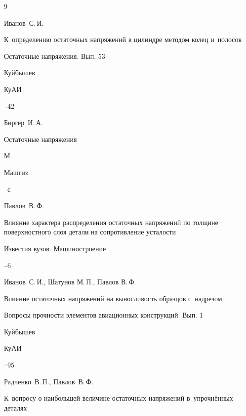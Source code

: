 \begin{thebibliography}{9}


\by Иванов~С.\,И.

\paper К~определению остаточных напряжений в цилиндре методом колец и~полосок

\inbook Остаточные напряжения. {\rm Вып. 53}

\publaddr Куйбышев

\publ КуАИ


--42




\by Биргер~И.\,А.

\book Остаточные напряжения

\publaddr М.

\publ Машгиз


~с






\by Павлов~В.\,Ф.

\paper Влияние характера распределения остаточных напряжений по толщине поверхностного слоя детали на сопротивление усталости

\jour Известия вузов. Машиностроение



--6




\by Иванов~С.\,И., Шатунов М.\,П., Павлов В.\,Ф.

\paper Влияние остаточных напряжений на выносливость образцов с~надрезом

\inbook Вопросы прочности элементов авиационных конструкций. {\rm Вып. 1}

\publaddr Куйбышев

\publ КуАИ


--95




\by  Радченко~В.\,П., Павлов~В.\,Ф.

\paper К~вопросу о наибольшей величине остаточных напряжений в~упрочнённых деталях


\end{thebibliography}
